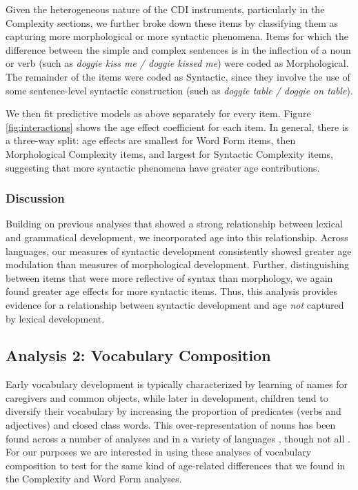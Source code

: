 \documentclass[10pt,letterpaper]{article}
\begin{document}
Given the heterogeneous nature of the CDI instruments, particularly in the Complexity sections, we further broke down these items by classifying them as capturing more morphological or more syntactic phenomena. Items for which the difference between the simple and complex sentences is in the inflection of a noun or verb (such as \emph{doggie kiss me / doggie kissed me}) were coded as Morphological. The remainder of the items were coded as Syntactic, since they involve the use of some sentence-level syntactic construction (such as \emph{doggie table / doggie on table}).

We then fit predictive models as above separately for every item. Figure \ref{fig:interactions} shows the age effect coefficient for each item. In general, there is a three-way split: age effects are smallest for Word Form items, then Morphological Complexity items, and largest for Syntactic Complexity items, suggesting that more syntactic phenomena have greater age contributions. 

\vfill
\subsubsection{Discussion}

Building on previous analyses that showed a strong relationship between lexical and grammatical development, we incorporated age into this relationship. Across languages, our measures of syntactic development consistently showed greater age modulation than measures of morphological development. Further, distinguishing between items that were more reflective of syntax than morphology, we again found greater age effects for more syntactic items. Thus, this analysis provides evidence for a relationship between syntactic development and age \emph{not} captured by lexical development.

\subsection{Analysis 2: Vocabulary Composition}

Early vocabulary development is typically characterized by learning of names for caregivers and common objects, while later in development, children tend to diversify their vocabulary by increasing the proportion of predicates (verbs and adjectives) and closed class words. This over-representation of nouns has been found across a number of analyses and in a variety of languages \cite{bates1994,caselli1995,bornstein2004}, though not all \cite{tardif1996,choi1995}.
For our purposes we are interested in using these analyses of vocabulary composition to test for the same kind of age-related differences that we found in the Complexity and Word Form analyses. 
\end{document}
